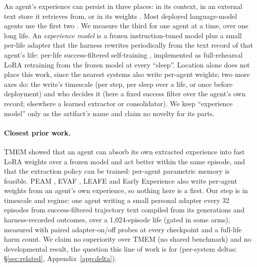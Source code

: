 \documentclass{article}
\begin{document}
An agent's experience can persist in three places: in its context, in an external text store it retrieves from, or in its weights \citep{dorovatas2026modular,back2026lora}. Most deployed language-model agents use the first two \citep{park2023generative,shinn2023reflexion,zhao2023expel}. We measure the third for one agent at a time, over one long life. An \emph{experience model} is a frozen instruction-tuned model plus a small per-life adapter that the harness rewrites periodically from the text record of that agent's life: per-life success-filtered self-training \citep{zelikman2022star,gulcehre2023rest,singh2023restem,anthony2017expert}, implemented as full-rehearsal LoRA \citep{hu2021lora} retraining from the frozen model at every ``sleep''. Location alone does not place this work, since the nearest systems also write per-agent weights; two more axes do: the write's timescale (per step, per sleep over a life, or once before deployment) and who decides it (here a fixed success filter over the agent's own record; elsewhere a learned extractor or consolidator). We keep ``experience model'' only as the artifact's name \citep{silver2025experience} and claim no novelty for its parts.

\paragraph{Closest prior work.} TMEM \citep{ren2026tmem} showed that an agent can absorb its own extracted experience into fast LoRA weights over a frozen model and act better within the same episode, and that the extraction policy can be trained: per-agent parametric memory is feasible. PEAM \citep{guo2026peam}, EVAF \citep{han2026evaf}, LEAFE \citep{ge2026leafe} and Early Experience \citep{zhang2025earlyexperience} also write per-agent weights from an agent's own experience, so nothing here is a first. Our step is in timescale and regime: one agent writing a small personal adapter every 32 episodes from success-filtered trajectory text compiled from its generations and harness-recorded outcomes, over a 1{,}024-episode life (gated in some arms), measured with paired adapter-on/off probes at every checkpoint and a full-life harm count. We claim no superiority over TMEM (no shared benchmark) and no developmental result, the question this line of work is for (per-system deltas: \S\ref{sec:related}, Appendix~\ref{app:delta}).
\end{document}
